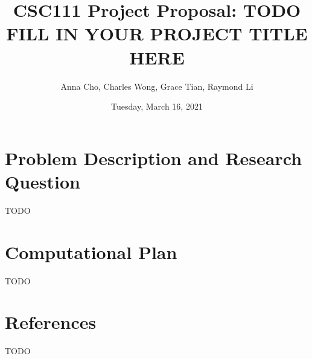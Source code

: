 \documentclass[fontsize=11pt]{article}
\title{CSC111 Project Proposal: TODO FILL IN YOUR PROJECT TITLE HERE}
\author{Anna Cho, Charles Wong, Grace Tian, Raymond Li}
\date{Tuesday, March 16, 2021}
\begin{document}
\maketitle

\section*{Problem Description and Research Question}

TODO

\section*{Computational Plan}

TODO

\section*{References}

TODO

\end{document}
